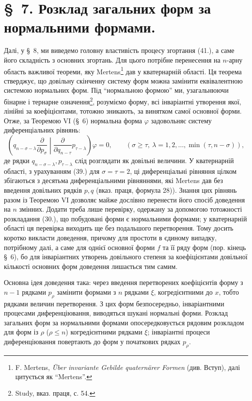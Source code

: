 \documentclass[11pt]{article}
\begin{document}
\section*{\S\ 7. Розклад загальних форм за нормальними формами.}

Далі, у \S\ 8, ми виведемо головну властивість процесу згортання (41.), а саме його складність з основних згортань. Для цього потрібне перенесення на $n$-арну область важливої теореми, яку Mertens\footnote{F. Mertens, \emph{\"Uber invariante Gebilde quatern\"arer Formen} (див. Вступ), далі цитується як ``Mertens''.} дав у кватернарній області. Ця теорема стверджує, що довільну скінченну систему форм можна замінити еквівалентною системою нормальних форм. Під ``нормальною формою'' ми, узагальнюючи бінарне і тернарне означення\footnote{Study, вказ. праця, с. 54.}, розуміємо форму, всі інваріантні утворення якої, лінійні за коефіцієнтами, тотожно зникають, за винятком самої основної форми. Отже, за Теоремою VI (\S\ 6) нормальна форма $\varphi$ задовольняє систему диференціальних рівнянь:
\begin{equation}
 \left(q_{n-\sigma-\lambda}\frac{\partial}{\partial p_\sigma}\middle|\frac{\partial}{\partial q_{n-\tau}}p_{\tau-\lambda}\right)\varphi=0,
 \qquad(\sigma\ge\tau,\ \lambda=1,2,\ldots,\min(\tau,n-\sigma)),
\tag{46}
\end{equation}
де рядки $q_{n-\sigma-\lambda},p_{\tau-\lambda}$ слід розглядати як довільні величини. У кватернарній області, з урахуванням (39.) для $\sigma=\tau=2$, ці диференціальні рівняння цілком збігаються з десятьма диференціальними рівняннями, які Mertens дав без введення довільних рядків $p,q$ (вказ. праця, формула 28)). Знання цих рівнянь разом із Теоремою VI дозволяє майже дослівно перенести його спосіб доведення на $n$ змінних. Додати треба лише перевірку, одержану за допомогою тотожності розкладання (30.), що побудовані форми є нормальними формами; у кватернарній області ця перевірка виходить ще без подальшого перетворення. Тому досить коротко викласти доведення, причому для простоти в єдиному випадку, потрібному далі, а саме для однієї основної форми $f$ та її ряду форм (пор. кінець \S\ 6), бо для інваріантних утворень довільного степеня за коефіцієнтами довільної кількості основних форм доведення лишається тим самим.

Основна ідея доведення така: через введення перетворених коефіцієнтів форму з $n-1$ рядками $p_\rho$ замінити формами з $n$ рядками $\xi$, когредієнтними до $x$, тобто рядками величин перетворення. З цих форм безпосередньо, інваріантними процесами диференціювання, виводяться шукані нормальні форми. Розклад загальних форм за нормальними формами опосередковується рядовим розкладом для форм із $\rho$ ($\rho\le n$) когредієнтними рядками $\xi$; інваріантні процеси диференціювання повертають до форм у початкових рядках $p_\rho$.
\end{document}
